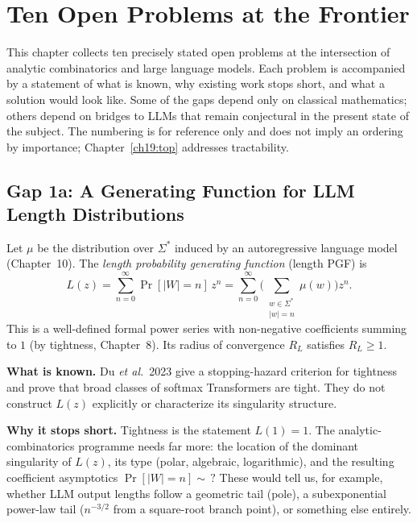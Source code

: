 \chapter{Ten Open Problems at the Frontier}
\label{ch18:top}

This chapter collects ten precisely stated open problems at the intersection of analytic combinatorics and large language models. Each problem is accompanied by a statement of what is known, why existing work stops short, and what a solution would look like. Some of the gaps depend only on classical mathematics; others depend on bridges to LLMs that remain conjectural in the present state of the subject. The numbering is for reference only and does not imply an ordering by importance; Chapter~\ref{ch19:top} addresses tractability.

\section{Gap 1a: A Generating Function for LLM Length Distributions}
\label{ch18:gap1a}

Let $\mu$ be the distribution over $\Sigma^*$ induced by an autoregressive language model (Chapter~10). The \emph{length probability generating function} (length PGF) is
$$
L(z)=\sum_{n=0}^{\infty}\Pr[|W|=n]\,z^n = \sum_{n=0}^{\infty}\biggl(\sum_{\substack{w\in\Sigma^* \\ |w|=n}}\mu(w)\biggr)z^n.
$$
This is a well-defined formal power series with non-negative coefficients summing to $1$ (by tightness, Chapter~8). Its radius of convergence $R_L$ satisfies $R_L\ge 1$.

\textbf{What is known.} Du \emph{et al.}\ 2023 \cite{DuEtAl2023} give a stopping-hazard criterion for tightness and prove that broad classes of softmax Transformers are tight. They do not construct $L(z)$ explicitly or characterize its singularity structure.

\textbf{Why it stops short.} Tightness is the statement $L(1)=1$. The analytic-combinatorics programme needs far more: the location of the dominant singularity of $L(z)$, its type (polar, algebraic, logarithmic), and the resulting coefficient asymptotics $\Pr[|W|=n]\sim\,?$ These would tell us, for example, whether LLM output lengths follow a geometric tail (pole), a subexponential power-law tail ($n^{-3/2}$ from a square-root branch point), or something else entirely.


